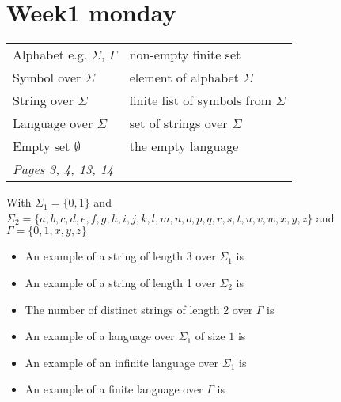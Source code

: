 \documentclass[12pt, oneside]{article}
\begin{document}
\begin{flushright}
\end{flushright} \section*{Week1 monday}


\begin{center}
    \begin{tabular}{|ll|}
    \hline
    Alphabet e.g. $\Sigma$, $\Gamma$ & 	non-empty finite set	 \\
    Symbol over $\Sigma$  & element of alphabet $\Sigma$\\
    String over $\Sigma$  &	finite list of symbols from $\Sigma$\\
    Language over $\Sigma$& set of strings over $\Sigma$ \\
    Empty set $\emptyset$ & the empty language\\
    \hline
    {\it Pages 3, 4, 13, 14 }& \\
    \hline
    \end{tabular}
    \end{center}
    
    With $\Sigma_1 = \{0,1\}$ and $\Sigma_2 = \{a,b,c,d,e,f,g,h,i,j,k,l,m,n,o,p,q,r,s,t,u,v,w,x,y,z\}$  and $\Gamma = \{0,1,x,y,z\}$
    
    \begin{itemize}
    \setlength{\itemsep}{10pt}
    \item[] An example of a string of length 3 over $\Sigma_1$ is 
    \item[] An example of  a string of length 1 over $\Sigma_2$ is 
    \item[] The number of distinct strings of length 2 over $\Gamma$ is
    \item[] An example of a language over $\Sigma_1$ of size $1$ is
    \item[] An example of an infinite language over $\Sigma_1$ is
    \item[] An example of  a finite language over $\Gamma$ is
    
    \end{itemize}
    
\end{document}
